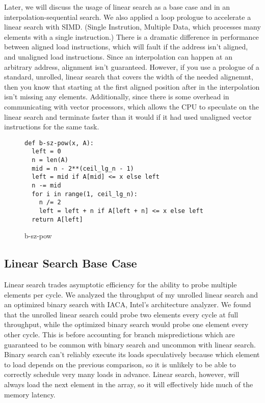 \documentclass[twocolumn]{article}
\begin{document}
Later, we will discuss the usage of linear search as a base case and in an interpolation-sequential search. We also applied a loop prologue to accelerate a linear search with SIMD. (Single Instrution, Multiple Data, which processes many elements with a single instruction.) There is a dramatic difference in performance between aligned load instructions, which will fault if the address isn't aligned, and unaligned load instructions. Since an interpolation can happen at an arbitrary address, alignment isn't guaranteed. However, if you use a prologue of a standard, unrolled, linear search that covers the width of the needed alignemnt, then you know that starting at the first aligned position after in the interpolation isn't missing any elements. Additionally, since there is some overhead in communicating with vector processors, which allows the CPU to speculate on the linear search and terminate faster than it would if it had used unaligned vector instructions for the same task. 

\begin{figure}[ht]
\begin{verbatim}
def b-sz-pow(x, A):
  left = 0
  n = len(A)
  mid = n - 2**(ceil_lg_n - 1)
  left = mid if A[mid] <= x else left
  n -= mid
  for i in range(1, ceil_lg_n):
    n /= 2
    left = left + n if A[left + n] <= x else left
  return A[left]
\end{verbatim}
\caption{b-sz-pow}
  \label{b-sz-pow}
\end{figure}

\subsection{Linear Search Base Case}
Linear search trades asymptotic efficiency for the ability to probe multiple elements per cycle. We analyzed the throughput of my unrolled linear search and an optimized binary search with IACA, Intel's architecture analyzer. We found that the unrolled linear search could probe two elements every cycle at full throughput, while the optimized binary search would probe one element every other cycle. This is before accounting for branch mispredictions which are guaranteed to be common with binary search and uncommon with linear search. Binary search can't reliably execute its loads speculatively because which element to load depends on the previous comparison, so it is unlikely to be able to correctly schedule very many loads in advance. Linear search, however, will always load the next element in the array, so it will effectively hide much of the memory latency.
\end{document}
